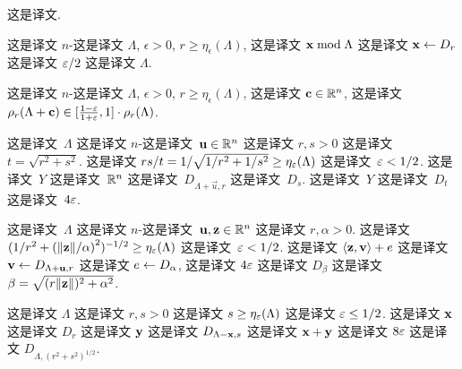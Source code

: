 这是译文.

\begin{lemma}
  \label{lem:smoothingcontinuous}  这是译文 $n$-这是译文 $\Lambda$, $\epsilon>0$, $r \geq
  \eta_{\epsilon}(\Lambda)$, 这是译文 $\mathbf{x} \bmod \Lambda$ 这是译文 $\mathbf{x} \leftarrow D_{r}$ 这是译文 $\varepsilon/2$ 这是译文 $\Lambda$.
\end{lemma}

\begin{lemma}
  \label{lem:smoothing}  这是译文 $n$-这是译文 $\Lambda$, $\epsilon>0$, $r \geq
  \eta_{\epsilon}(\Lambda)$, 这是译文 $\mathbf{c} \in \mathbb{R}^n$, 这是译文 $\rho_{r}(\Lambda + \mathbf{c}) \in [
  \tfrac{1-\varepsilon}{1+\varepsilon}, 1 ] \cdot \rho_{r}(\Lambda)$.
\end{lemma}

\begin{lemma}
\label{le:discrete_plus_cont_Gauss} 这是译文~$\Lambda$ 这是译文 $n$-这是译文~$\mathbf{u}\in \mathbb{R}^n$ 这是译文 $r, s > 0$ 这是译文 $t=\sqrt{r^2+ s^2}$. 这是译文 $rs/t=1/\sqrt{1/r^2+1/s^2} \geq \eta_{\varepsilon} (\Lambda)$ 这是译文~$\varepsilon <
1/2$. 这是译文~$Y$ 这是译文~$\mathbb{R}^n$ 这是译文~$D_{\Lambda+\vec{u},r}$ 这是译文~$D_s$. 这是译文~$Y$ 这是译文~$D_t$ 这是译文~$4\varepsilon$.
\end{lemma}

\begin{lemma}
\label{lem:smoothip} 这是译文~$\Lambda$ 这是译文 $n$-这是译文~$\mathbf{{u}}, \mathbf{{z}}\in \mathbb{R}^n$ 这是译文 $r, \alpha > 0$. 这是译文 $(1/r^2+\left(\|{\mathbf{{z}}}\|/\alpha\right)^2)^{-1/2} \geq \eta_{\varepsilon} (\Lambda)$ 这是译文~$\varepsilon <
1/2$. 这是译文 $\langle\mathbf{{z}},\mathbf{{v}}\rangle+e$ 这是译文 $\mathbf{{v}} \gets D_{\Lambda+\mathbf{{u}}, r}$ 这是译文 $e \gets D_{\alpha}$, 这是译文 $4\varepsilon$ 这是译文 $D_{\beta}$ 这是译文 $\beta = \sqrt{(r \|\mathbf{{z}}\|)^2+\alpha^2}$.
\end{lemma}

\begin{lemma}
\label{lem:peikertdiscretegauss} 这是译文 $\Lambda$ 这是译文 $r,s>0$ 这是译文 $s \ge \eta_\varepsilon(\Lambda)$ 这是译文 $\varepsilon \le 1/2$. 这是译文 $\mathbf{x}$ 这是译文 $D_{r}$ 这是译文 $\mathbf{y}$ 这是译文 $D_{\Lambda-\mathbf{x},s}$ 这是译文 $\mathbf{x}+\mathbf{y}$ 这是译文 $8 \varepsilon$ 这是译文 $D_{\Lambda,(r^2+s^2)^{1/2}}$.
\end{lemma}


